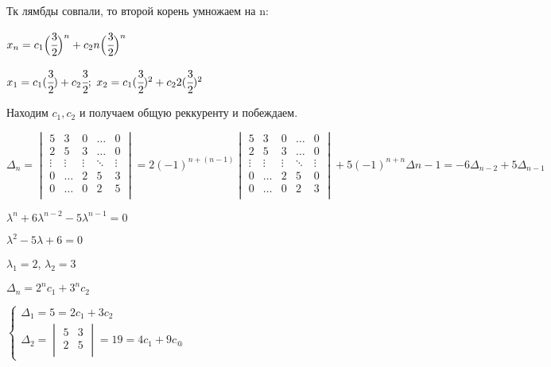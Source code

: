 Тк лямбды совпали, то второй корень умножаем на n: %

\(x_n  = c_1 \Big(\cfrac{3}{2}\Big)^n  + c_2 n \Big (\cfrac{3}{2}\Big )^n \)

\(x_1  =c_1 (\cfrac{3}{2}) + c_2 \cfrac{3}{2};\) 
\(x_2  =c_1 (\cfrac{3}{2})^2 + c_2 2 (\cfrac{3}{2})^2\) 

Находим \(c_1,c_2\) и получаем общую реккуренту и побеждаем.










\(\Delta_n = \begin{vmatrix}
5 & 3 & 0 & \ldots & 0 \\
2 & 5 & 3 & \ldots & 0 \\
\vdots & \vdots & \vdots & \ddots & \vdots\\
0 & \ldots & 2 & 5 & 3\\
0 & \ldots & 0 & 2 & 5\\
\end{vmatrix} 
= 2 (-1)^{n + (n - 1)} \begin{vmatrix}
5 & 3 & 0 & \ldots & 0 \\
2 & 5 & 3 & \ldots & 0 \\
\vdots & \vdots & \vdots & \ddots & \vdots\\
0 & \ldots & 2 & 5 & 0\\
0 & \ldots & 0 & 2 & 3\\
\end{vmatrix} + 5(-1)^{n + n} \Delta{n - 1} = 
-6 \Delta_{n - 2} + 5\Delta_{n - 1}\)

\(\lambda^n + 6 \lambda^{n - 2} - 5\lambda^{n - 1} = 0\)

\(\lambda^2 - 5 \lambda + 6 = 0\)

\(\lambda_1 = 2\), \(\lambda_2 = 3\)

\(\Delta_n =2^nc_1 + 3^nc_2\)

\(
\begin{cases}

    \Delta_1  =5  =2 c_1 + 3 c_2 \\
     
    \Delta_2 = \begin{vmatrix}
        5 & 3 \\
        2 & 5 \\
    \end{vmatrix}
    = 19 = 4c_1  + 9c_@
\end{cases}\)


